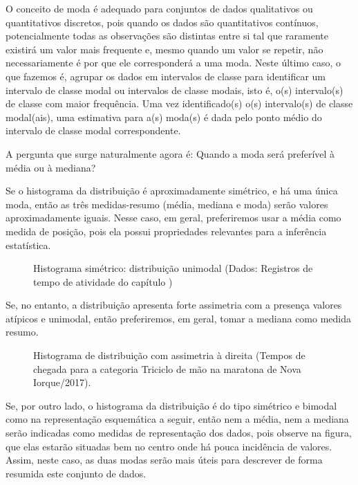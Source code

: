 O conceito de moda é adequado para conjuntos de dados qualitativos ou quantitativos discretos, pois quando os dados são quantitativos contínuos, potencialmente todas as observações são distintas entre si tal que raramente existirá um valor mais frequente e, mesmo quando um valor se repetir, não necessariamente é por que ele corresponderá a uma moda. Neste último caso, o que fazemos é, agrupar os dados em intervalos de classe para identificar um intervalo de classe modal ou intervalos de classe modais, isto é, o(s) intervalo(s) de classe com maior frequência. Uma vez identificado(s) o(s) intervalo(s) de classe modal(ais), uma estimativa para a(s) moda(s) é dada pelo ponto médio do intervalo de classe modal correspondente.

A pergunta que surge naturalmente agora é: Quando a moda será preferível à média ou à mediana?

Se o histograma da distribuição é aproximadamente simétrico, e há uma única moda, então as três medidas-resumo (média, mediana e moda) serão valores aproximadamente iguais. Nesse caso, em geral, preferiremos usar a média como medida de posição, pois ela possui propriedades relevantes para a inferência estatística.

\begin{figure}[H]
\centering
\capstart

\noindent{}
\caption{Histograma simétrico: distribuição unimodal (Dados: Registros de tempo de atividade do capítulo )}\label{\detokenize{PE104-1:id4}}\label{\detokenize{PE104-1:id18}}\end{figure}

Se, no entanto, a distribuição apresenta forte assimetria com a presença valores atípicos e unimodal, então preferiremos, em geral, tomar a mediana como medida resumo.

\begin{figure}[H]
\centering
\capstart

\noindent{}
\caption{Histograma de distribuição com assimetria à direita (Tempos de chegada para a categoria Triciclo de mão na maratona de Nova Iorque/2017).}\label{\detokenize{PE104-1:fig-assimetriadireita}}\label{\detokenize{PE104-1:id19}}\end{figure}

Se, por outro lado, o histograma da distribuição é do tipo simétrico e bimodal como na representação esquemática a seguir, então nem a média, nem a mediana serão indicadas como medidas de representação dos dados, pois observe na figura, que elas estarão situadas bem no centro onde há pouca incidência de valores. Assim, neste caso, as duas modas serão mais úteis para descrever de forma resumida este conjunto de dados.

